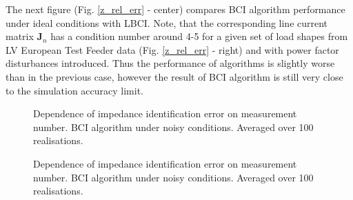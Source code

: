 \documentclass[journal,10pt,onecolumn,draftclsnofoot,]{IEEEtran}
\theoremstyle{plain}
\theoremstyle{definition}
\theoremstyle{remark}
\begin{document}
The next figure (Fig. \ref{z_rel_err} - center) compares BCI algorithm performance under ideal conditions with LBCI. Note, that the corresponding line current matrix $\bm{J}_n$ has a condition number around 4-5 for a given set of load shapes from LV European Test Feeder data (Fig. \ref{z_rel_err} - right) and with power factor disturbances introduced. Thus the performance of algorithms is slightly worse than in the previous case, however the result of BCI algorithm is still very close to the simulation accuracy limit.

\begin{figure*}[t]
\begin{subfigure}{0.33\linewidth}
\centering
\begin{adjustbox}{width=1\columnwidth}

\end{adjustbox}
\end{subfigure}
\begin{subfigure}{0.33\linewidth}
\centering
\begin{adjustbox}{width=1\columnwidth}

\end{adjustbox}
\end{subfigure}
\begin{subfigure}{0.33\linewidth}
\centering
\begin{adjustbox}{width=1\columnwidth}

\end{adjustbox}
\end{subfigure}
\caption{Dependence of impedance identification error on measurement number. BCI algorithm under noisy conditions. Averaged over 100 realisations.}
\label{z_rel_err3}
\end{figure*}

\begin{figure*}[t]
\begin{subfigure}{0.33\linewidth}
\centering
\begin{adjustbox}{width=1\columnwidth}

\end{adjustbox}
\end{subfigure}
\begin{subfigure}{0.33\linewidth}
\centering
\begin{adjustbox}{width=1\columnwidth}

\end{adjustbox}
\end{subfigure}
\begin{subfigure}{0.33\linewidth}
\centering
\begin{adjustbox}{width=1\columnwidth}

\end{adjustbox}
\end{subfigure}
\caption{Dependence of impedance identification error on measurement number. BCI algorithm under noisy conditions. Averaged over 100 realisations.}
\label{z_rel_err4}
\end{figure*}
\end{document}

